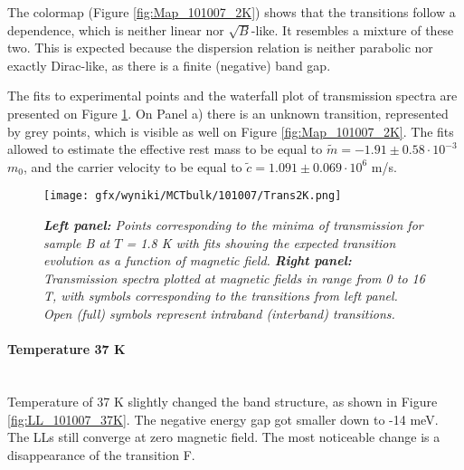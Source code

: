\documentclass[titlepage,a4paper]{book}
\newcommand{\wciecie}{\quad\phantom{v}}
\newcommand{\myparagraph}[1]{\paragraph{#1}\mbox{}\\}
\begin{document}
The colormap (Figure \ref{fig:Map_101007_2K}) shows that the transitions follow a dependence, which is neither linear nor  $\sqrt{B}$-like. It resembles a mixture of these two. This is expected because the dispersion relation is neither parabolic nor exactly Dirac-like, as there is a finite (negative) band gap. 

The fits to experimental points and the waterfall plot of transmission spectra are presented on Figure \ref{fig:Spectra_101007_2K}. On Panel a) there is an unknown transition, represented by grey points, which is visible as well on Figure \ref{fig:Map_101007_2K}. The fits allowed to estimate the effective rest mass to be equal to $\tilde m = -1.91 \pm 0.58 \cdot 10^{-3}$ $m_0$, and the carrier velocity to be equal to $\tilde{c} = 1.091 \pm 0.069 \cdot 10^6$ m/s. 

\begin{figure}[H]
	\centering
	\texttt{[image: gfx/wyniki/MCTbulk/101007/Trans2K.png]}
	\vspace{-10pt}
	\caption{\textit{\textbf{Left panel:} Points corresponding to the minima of transmission for sample B at $T$ = 1.8 K with fits showing the expected transition evolution as a function of magnetic field. \textbf{Right panel:} Transmission spectra plotted at magnetic fields in range from 0 to 16 T, with symbols corresponding to the transitions from left panel. Open (full) symbols represent intraband (interband) transitions.}}
	\label{fig:Spectra_101007_2K}
\end{figure} 

\myparagraph{Temperature 37 K}
\wciecie
Temperature of 37 K slightly changed the band structure, as shown in Figure \ref{fig:LL_101007_37K}. The negative energy gap got smaller down to -14 meV. The LLs still converge at zero magnetic field. The most noticeable change is a disappearance of the transition F. 
\end{document}
